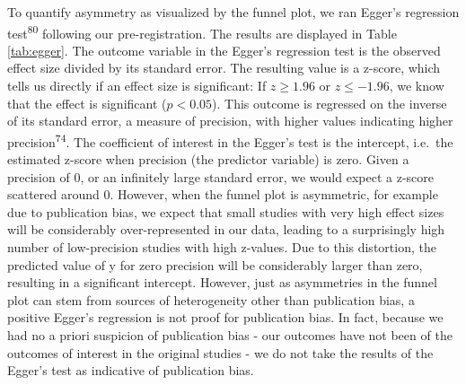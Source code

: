 \documentclass[
  man]{apa6}
\begin{document}
To quantify asymmetry as visualized by the funnel plot, we ran Egger's regression test\textsuperscript{80} following our pre-registration. The results are displayed in Table \ref{tab:egger}. The outcome variable in the Egger's regression test is the observed effect size divided by its standard error. The resulting value is a z-score, which tells us directly if an effect size is significant: If \(z \geq 1.96\) or \(z \leq -1.96\), we know that the effect is significant (\(p < 0.05\)). This outcome is regressed on the inverse of its standard error, a measure of precision, with higher values indicating higher precision\textsuperscript{74}. The coefficient of interest in the Egger's test is the intercept, i.e.~the estimated z-score when precision (the predictor variable) is zero. Given a precision of 0, or an infinitely large standard error, we would expect a z-score scattered around 0. However, when the funnel plot is asymmetric, for example due to publication bias, we expect that small studies with very high effect sizes will be considerably over-represented in our data, leading to a surprisingly high number of low-precision studies with high z-values. Due to this distortion, the predicted value of y for zero precision will be considerably larger than zero, resulting in a significant intercept. However, just as asymmetries in the funnel plot can stem from sources of heterogeneity other than publication bias, a positive Egger's regression is not proof for publication bias. In fact, because we had no a priori suspicion of publication bias - our outcomes have not been of the outcomes of interest in the original studies - we do not take the results of the Egger's test as indicative of publication bias.
\end{document}

